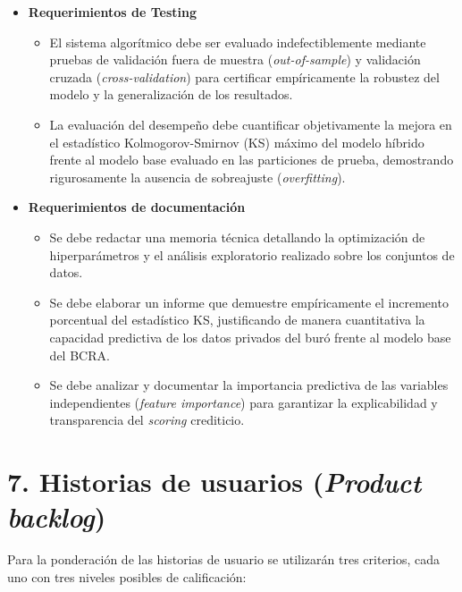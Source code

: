 \documentclass[
11pt, %
]{charter}
\begin{document}
\begin{itemize}
    \item \textbf{Requerimientos de Testing}
    \begin{itemize}
        \item El sistema algorítmico debe ser evaluado indefectiblemente mediante pruebas de validación fuera de muestra (\textit{out-of-sample}) y validación cruzada (\textit{cross-validation}) para certificar empíricamente la robustez del modelo y la generalización de los resultados.
        \item La evaluación del desempeño debe cuantificar objetivamente la mejora en el estadístico Kolmogorov-Smirnov (KS) máximo del modelo híbrido frente al modelo base evaluado en las particiones de prueba, demostrando rigurosamente la ausencia de sobreajuste (\textit{overfitting}).
    \end{itemize}

    \item \textbf{Requerimientos de documentación}
    \begin{itemize}
        \item Se debe redactar una memoria técnica detallando la optimización de hiperparámetros y el análisis exploratorio realizado sobre los conjuntos de datos.
        \item Se debe elaborar un informe que demuestre empíricamente el incremento porcentual del estadístico KS, justificando de manera cuantitativa la capacidad predictiva de los datos privados del buró frente al modelo base del BCRA.
        \item Se debe analizar y documentar la importancia predictiva de las variables independientes (\textit{feature importance}) para garantizar la explicabilidad y transparencia del \textit{scoring} crediticio.
    \end{itemize}

\end{itemize}

\section{7. Historias de usuarios (\textit{Product backlog})}
\label{sec:backlog}

Para la ponderación de las historias de usuario se utilizarán tres criterios, cada uno con tres niveles posibles de calificación:
\end{document}
